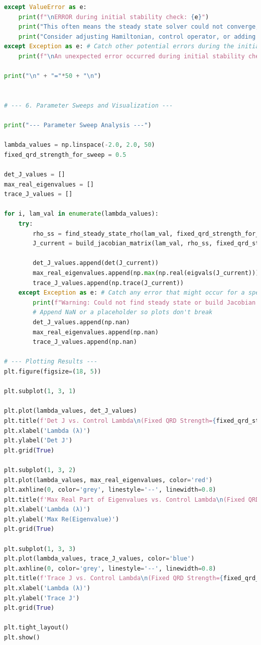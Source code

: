 \documentclass[9pt]{article}
\begin{document}
\begin{lstlisting}[language=Python, basicstyle=\ttfamily\footnotesize, breaklines=true, frame=single, caption={Python Code for Stability Analysis of Quantum Subsystem}, label={lst:qrd_code}]
except ValueError as e:
    print(f"\nERROR during initial stability check: {e}")
    print("This often means the steady state solver could not converge, likely due to a singular matrix.")
    print("Consider adjusting Hamiltonian, control operator, or adding more general dissipation.")
except Exception as e: # Catch other potential errors during the initial check
    print(f"\nAn unexpected error occurred during initial stability check: {e}")

print("\n" + "="*50 + "\n")


# --- 6. Parameter Sweeps and Visualization ---

print("--- Parameter Sweep Analysis ---")

lambda_values = np.linspace(-2.0, 2.0, 50)
fixed_qrd_strength_for_sweep = 0.5

det_J_values = []
max_real_eigenvalues = []
trace_J_values = []

for i, lam_val in enumerate(lambda_values):
    try:
        rho_ss = find_steady_state_rho(lam_val, fixed_qrd_strength_for_sweep)
        J_current = build_jacobian_matrix(lam_val, rho_ss, fixed_qrd_strength_for_sweep)
        
        det_J_values.append(det(J_current))
        max_real_eigenvalues.append(np.max(np.real(eigvals(J_current))))
        trace_J_values.append(np.trace(J_current))
    except Exception as e: # Catch any error that might occur for a specific lambda
        print(f"Warning: Could not find steady state or build Jacobian for lambda={lam_val:.2f}. Error: {e}")
        # Append NaN or a placeholder so plots don't break
        det_J_values.append(np.nan)
        max_real_eigenvalues.append(np.nan)
        trace_J_values.append(np.nan)

# --- Plotting Results ---
plt.figure(figsize=(18, 5))

plt.subplot(1, 3, 1)

plt.plot(lambda_values, det_J_values)
plt.title(f'Det J vs. Control Lambda\n(Fixed QRD Strength={fixed_qrd_strength_for_sweep})')
plt.xlabel('Lambda (λ)')
plt.ylabel('Det J')
plt.grid(True)

plt.subplot(1, 3, 2)
plt.plot(lambda_values, max_real_eigenvalues, color='red')
plt.axhline(0, color='grey', linestyle='--', linewidth=0.8)
plt.title(f'Max Real Part of Eigenvalues vs. Control Lambda\n(Fixed QRD Strength={fixed_qrd_strength_for_sweep})')
plt.xlabel('Lambda (λ)')
plt.ylabel('Max Re(Eigenvalue)')
plt.grid(True)

plt.subplot(1, 3, 3)
plt.plot(lambda_values, trace_J_values, color='blue')
plt.axhline(0, color='grey', linestyle='--', linewidth=0.8)
plt.title(f'Trace J vs. Control Lambda\n(Fixed QRD Strength={fixed_qrd_strength_for_sweep})')
plt.xlabel('Lambda (λ)')
plt.ylabel('Trace J')
plt.grid(True)

plt.tight_layout()
plt.show()
\end{lstlisting}
\end{document}
